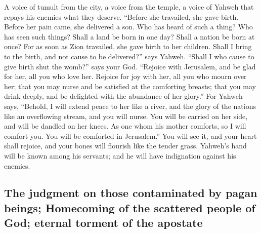 \begin{paracol}{2}
\begin{otherlanguage}{english}
 A voice of tumult from the city, a voice from the temple,
a voice of Yahweh that repays his enemies what they deserve.
 ``Before she travailed, she gave birth. Before her pain
came, she delivered a son.  Who has heard of such a thing?
Who has seen such things? Shall a land be born in one day? Shall a
nation be born at once? For as soon as Zion travailed, she gave birth to
her children.  Shall I bring to the birth, and not cause
to be delivered?'' says Yahweh. ``Shall I who cause to give birth shut
the womb?'' says your God.  ``Rejoice with Jerusalem, and
be glad for her, all you who love her. Rejoice for joy with her, all you
who mourn over her;  that you may nurse and be satisfied
at the comforting breasts; that you may drink deeply, and be delighted
with the abundance of her glory.''  For Yahweh says,
``Behold, I will extend peace to her like a river, and the glory of the
nations like an overflowing stream, and you will nurse. You will be
carried on her side, and will be dandled on her knees. 
As one whom his mother comforts, so I will comfort you. You will be
comforted in Jerusalem.''  You will see it, and your
heart shall rejoice, and your bones will flourish like the tender grass.
Yahweh's hand will be known among his servants; and he will have
indignation against his enemies.

\hypertarget{the-judgment-on-those-contaminated-by-pagan-beings-homecoming-of-the-scattered-people-of-god-eternal-torment-of-the-apostate}{%
\subsection{The judgment on those contaminated by pagan beings;
Homecoming of the scattered people of God; eternal torment of the
apostate}\label{the-judgment-on-those-contaminated-by-pagan-beings-homecoming-of-the-scattered-people-of-god-eternal-torment-of-the-apostate}}


\end{otherlanguage}
\end{paracol}
